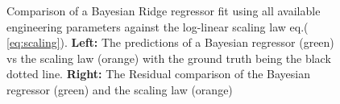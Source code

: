 \documentclass[a4paper, twoside, final, 12pt]{article}
\begin{document}
{\begin{figure}[H]
\begin{subfigure}{0.495\linewidth}
	\end{subfigure}\hfill
	\caption{Comparison of a Bayesian Ridge regressor fit using all available engineering parameters against the log-linear scaling law eq.\;( \ref{eq:scaling}). \textbf{Left:} The predictions of a Bayesian regressor (green) vs the scaling law (orange) with the ground truth being the black dotted line. \textbf{Right:} The Residual comparison of the Bayesian regressor (green) and the scaling law (orange) }
	\label{fig:lin_reg}
\end{figure}

}
\end{document}
